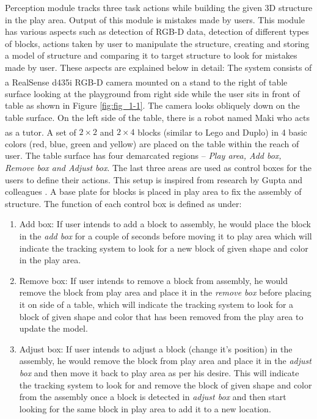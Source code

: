 Perception module tracks three task actions while building the given 3D structure in the play area. Output of this module is mistakes made by users. This module has various aspects such as detection of RGB-D data, detection of different types of blocks, actions taken by user to manipulate the structure, creating and storing a model of structure and comparing it to target structure to look for mistakes made by user. These aspects are explained below in detail:
The system consists of a RealSense\textsuperscript\textregistered{}  d435i RGB-D camera mounted on a stand to the right of table surface looking at the playground from right side while the user sits in front of table as shown in Figure \ref{fig:fig_1-1}. The camera looks obliquely down on the table surface. On the left side of the table, there is a robot named Maki who acts as a tutor. A set of $2 \times 2$ and $2 \times 4$ blocks (similar to Lego\textsuperscript\textregistered{} and Duplo\textsuperscript\textregistered{}) in 4 basic colors (red, blue, green and yellow) are placed on the table within the reach of user. The table surface has four demarcated regions -- \textit{Play area, Add box, Remove box and Adjust box}. The last three areas are used as control boxes for the users to define their actions. This setup is inspired from research by Gupta and colleagues \parencite{gupta2012duplotrack}. A base plate for blocks is placed in play area to fix the assembly of structure. The function of each control box is defined as under:
\begin{enumerate}
    \item Add box: If user intends to add a block to assembly, he would place the block in the \emph{add box} for a couple of seconds before moving it to play area which will indicate the tracking system to look for a new block of given shape and color in the play area. 
    \item Remove box: If user intends to remove a block from assembly, he would remove the block from play area and place it in the \emph{remove box} before placing it on side of a table, which will indicate the tracking system to look for a block of given shape and color that has been removed from the play area to update the model.
    \item Adjust box: If user intends to adjust a block (change it's position) in the assembly, he would remove the block from play area and place it in the \emph{adjust box} and then move it back to play area as per his desire. This will indicate the tracking system to look for and remove the block of given shape and color from the assembly once a block is detected in \emph{adjust box} and then start looking for the same block in play area to add it to a new location. 
\end{enumerate}

